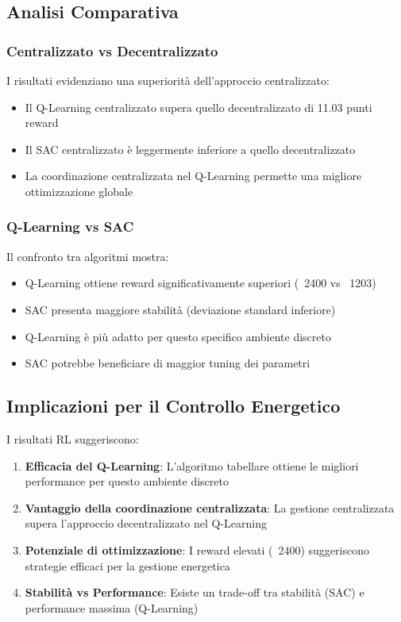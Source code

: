 \documentclass[12pt,a4paper,twoside]{report}
\begin{document}
\subsection{Analisi Comparativa}

\subsubsection{Centralizzato vs Decentralizzato}
I risultati evidenziano una superiorità dell'approccio centralizzato:
\begin{itemize}
    \item Il Q-Learning centralizzato supera quello decentralizzato di 11.03 punti reward
    \item Il SAC centralizzato è leggermente inferiore a quello decentralizzato
    \item La coordinazione centralizzata nel Q-Learning permette una migliore ottimizzazione globale
\end{itemize}

\subsubsection{Q-Learning vs SAC}
Il confronto tra algoritmi mostra:
\begin{itemize}
    \item Q-Learning ottiene reward significativamente superiori (~2400 vs ~1203)
    \item SAC presenta maggiore stabilità (deviazione standard inferiore)
    \item Q-Learning è più adatto per questo specifico ambiente discreto
    \item SAC potrebbe beneficiare di maggior tuning dei parametri
\end{itemize}

\subsection{Implicazioni per il Controllo Energetico}

I risultati RL suggeriscono:

\begin{enumerate}
    \item \textbf{Efficacia del Q-Learning}: L'algoritmo tabellare ottiene le migliori performance per questo ambiente discreto
    
    \item \textbf{Vantaggio della coordinazione centralizzata}: La gestione centralizzata supera l'approccio decentralizzato nel Q-Learning
    
    \item \textbf{Potenziale di ottimizzazione}: I reward elevati (~2400) suggeriscono strategie efficaci per la gestione energetica
    
    \item \textbf{Stabilità vs Performance}: Esiste un trade-off tra stabilità (SAC) e performance massima (Q-Learning)
\end{enumerate}
\end{document}
